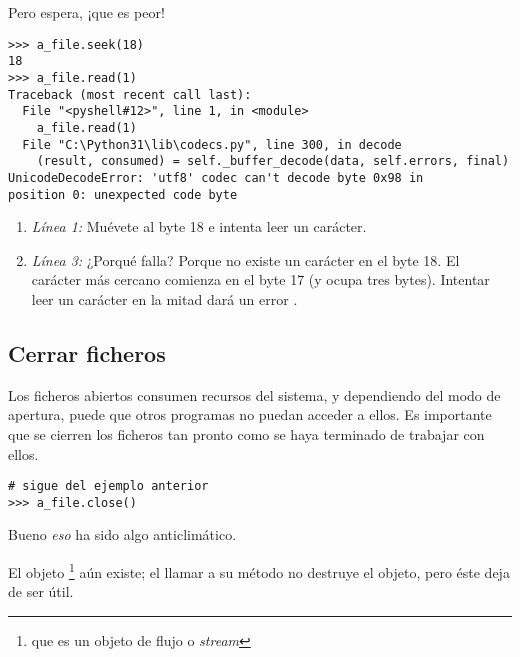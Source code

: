 Pero espera, ¡que es peor!

\noindent\begin{minipage}{\textwidth}
\begin{lstlisting}[mathescape=True]
>>> a_file.seek(18)
18
>>> a_file.read(1)
Traceback (most recent call last):
  File "<pyshell#12>", line 1, in <module>
    a_file.read(1)
  File "C:\Python31\lib\codecs.py", line 300, in decode
    (result, consumed) = self._buffer_decode(data, self.errors, final)
UnicodeDecodeError: 'utf8' codec can't decode byte 0x98 in 
position 0: unexpected code byte
\end{lstlisting}
\end{minipage}

\begin{enumerate}

\item \emph{Línea 1:} Muévete al byte 18 e intenta leer un carácter.

\item \emph{Línea 3:} ¿Porqué falla? Porque no existe un carácter en el byte 18. El carácter más cercano comienza en el byte 17 (y ocupa tres bytes). Intentar leer un carácter en la mitad dará un error .

\end{enumerate}

\subsection{Cerrar ficheros}

Los ficheros abiertos consumen recursos del sistema, y dependiendo del modo de apertura, puede que otros programas no puedan acceder a ellos. Es importante que se cierren los ficheros tan pronto como se haya terminado de trabajar con ellos.

\noindent\begin{minipage}{\textwidth}
\begin{lstlisting}[mathescape=True]
# sigue del ejemplo anterior
>>> a_file.close()
\end{lstlisting}
\end{minipage}

Bueno \emph{eso} ha sido algo anticlimático.

El objeto \footnote{que es un objeto de flujo o \emph{stream}} aún existe; el llamar a su método  no destruye el objeto, pero éste deja de ser útil.

